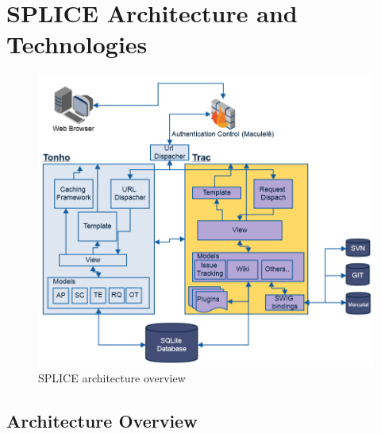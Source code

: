 \section{SPLICE Architecture and Technologies}
\label{sc:architecture}

\begin{figure}[htp]
\begin{center}
  \includegraphics[width=15cm]{chapters/proposed_solution/img/architecture.png}
  \caption[SPLICE architecture overview]{SPLICE architecture overview }
  \label{fg:splice-architecture}
\end{center}
\end{figure}


\subsection{Architecture Overview}



